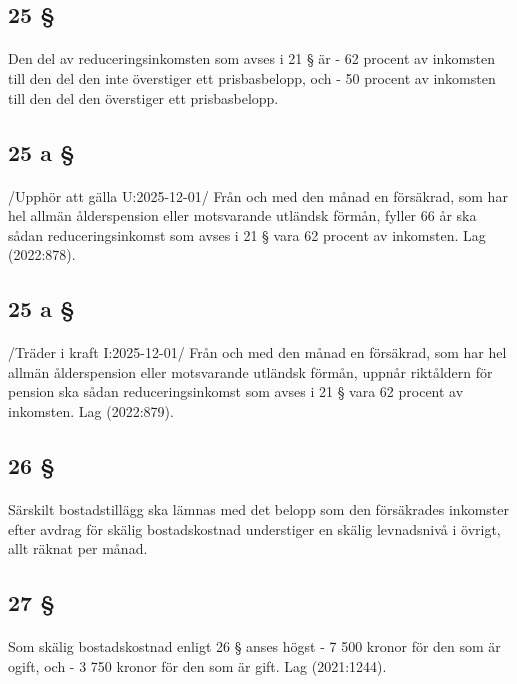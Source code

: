 \documentclass[a4paper,notitlepage,openany,10pt]{book}
\begin{document}
\subsection*{25 §}
\paragraph*{}
Den del av reduceringsinkomsten som avses i 21 § är
\newline - 62 procent av inkomsten till den del den inte överstiger ett prisbasbelopp, och
\newline - 50 procent av inkomsten till den del den överstiger ett prisbasbelopp.
\subsection*{25 a §}
\paragraph*{}
/Upphör att gälla U:2025-12-01/
Från och med den månad en försäkrad, som har hel allmän ålderspension eller motsvarande utländsk förmån, fyller 66 år ska sådan reduceringsinkomst som avses i 21 § vara 62 procent av inkomsten.
Lag (2022:878).
\subsection*{25 a §}
\paragraph*{}
/Träder i kraft I:2025-12-01/
Från och med den månad en försäkrad, som har hel allmän ålderspension eller motsvarande utländsk förmån, uppnår riktåldern för pension ska sådan reduceringsinkomst som avses i 21 § vara 62 procent av inkomsten.
Lag (2022:879).
\subsection*{26 §}
\paragraph*{}
Särskilt bostadstillägg ska lämnas med det belopp som den försäkrades inkomster efter avdrag för skälig bostadskostnad understiger en skälig levnadsnivå i övrigt, allt räknat per månad.
\subsection*{27 §}
\paragraph*{}
Som skälig bostadskostnad enligt 26 § anses högst
\newline - 7 500 kronor för den som är ogift, och
\newline - 3 750 kronor för den som är gift.
Lag (2021:1244).
\end{document}
